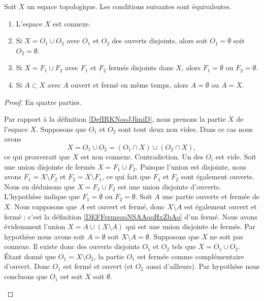 \begin{proposition} \label{PropHSjJcIr}
	Soit \( X\) un espace topologique. Les conditions suivantes sont équivalentes.
	\begin{enumerate}
		\item       \label{ITEMooXHIKooGqrgTs}
		      L'espace \( X\) est connexe.
		\item       \label{ITEMooRTNPooADKVnw}
		      Si \( X=O_1\cup O_2\) avec \( O_1\) et \( O_2\) des ouverts disjoints, alors soit \( O_1=\emptyset\) soit \( O_2=\emptyset\).
		\item       \label{ITEMooOEZYooFBNaOZ}
		      Si \( X=F_1\cup F_2\) avec \( F_1\) et \( F_2\) fermés disjoints dans \( X\), alors \( F_1=\emptyset\) ou \( F_2=\emptyset\).
		\item       \label{ITEMooNIPZooIDPmEf}
		      Si \( A\subset X\) avec \( A\) ouvert et fermé en même temps, alors \( A=\emptyset\) ou \( A=X\).
	\end{enumerate}
\end{proposition}

\begin{proof}
	En quatre parties.
	\begin{subproof}
		Par rapport à la définition \ref{DefIRKNooJJlmiD}, nous prenons la partie \( X\) de l'espace \( X\). Supposons que \( O_1\) et \( O_2\) sont tout deux non vides. Dans ce cas nous avons
		\begin{equation}
			X= O_1\cup O_2 = (O_1\cap X)\cup (O_2\cap X),
		\end{equation}
		ce qui prouverait que \( X\) est non connexe. Contradiction. Un des \( O_i\) est vide.
		Soit une union disjointe de fermés \( X=F_1\cup F_2\). Puisque l'union est disjointe, nous avons \( F_1=X\setminus F_2\) et \( F_2=X\setminus F_1\), ce qui fait que \( F_1\) et \( F_2\) sont également ouverts. Nous en déduisons que \( X=F_1\cup F_2\) est une union disjointe d'ouverts. L'hypothèse indique que \( F_1=\emptyset\) ou \( F_2=\emptyset\).
		Soit \( A\) une partie ouverte et fermée de \( X\). Nous supposons que \( A\) est ouvert et fermé, donc \( X\setminus A\) est également ouvert et fermé : c'est la définition \ref{DEFFermeooNSAAooHxZbAo} d'un fermé. Nous avons évidemment l'union \( X=A\cup(X\setminus A)\) qui est une union disjointe de fermés. Par hypothèse nous avons soit \( A=\emptyset\) soit \( X\setminus A=\emptyset\).
		Supposons que \( X\) ne soit pas connexe. Il existe donc des ouverts disjoints \( O_1\) et \( O_2\) tels que \( X=O_1\cup O_2\). Étant donné que \( O_1=X\setminus O_2\), la partie \( O_1\) est fermée comme complémentaire d'ouvert. Donc \( O_1\) est fermé et ouvert (et \( O_2\) aussi d'ailleurs). Par hypothèse nous concluons que \( O_1\) est soit \( X\) soit \( \emptyset\).
	\end{subproof}
\end{proof}


